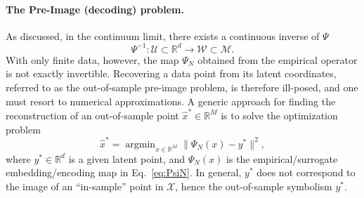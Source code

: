 \documentclass{article}
\DeclareMathOperator*{\argmin}{argmin}
\begin{document}
\paragraph{The Pre-Image (decoding) problem.} As discussed, in the continuum limit, there exists a continuous inverse of $\Psi$
\begin{equation}
\Psi^{-1} : \mathcal{U} \subset \mathbb{R}^d \longrightarrow \mathcal{W} \subset \mathcal{M}.
\end{equation}
With only finite data, however, the map $\Psi_N$ obtained from the empirical operator is not exactly invertible. Recovering a data point from its latent coordinates, referred to as the out-of-sample pre-image problem, is therefore ill-posed, and one must resort to numerical approximations. A generic approach for finding the reconstruction of an out-of-sample point $\hat{x}^* \in \mathbb{R}^M$ is to solve the optimization problem
\begin{equation}
\hat{x}^*= \argmin_{x \in \mathbb{R}^M} \big\| \Psi_{N}(x) - y^* \big\|^2,
\label{eq:PI_opt}
\end{equation}
where $y^* \in \mathbb{R}^d$ is a given latent point, and $\Psi_N(x)$ is the empirical/surrogate embedding/encoding map in Eq.~\eqref{eq:PsiN}. In general, $y^*$ does not correspond to the image of an ``in-sample'' point in $\mathcal{X}$, hence the out-of-sample symbolism $y^*$.
\end{document}
